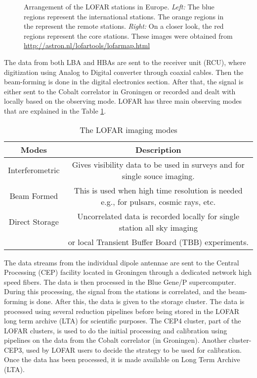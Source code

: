 \documentclass[../main/thesis_msc.tex]{subfiles}
\begin{document}
\begin{figure}
        \centering
        \caption{Arrangement of the LOFAR stations in Europe. \textit{Left:} The blue regions represent the international stations. The orange regions in the represent the remote stations. \textit{Right:} On a closer look, the red regions represent the core stations. These images were obtained from \url{http://astron.nl/lofartools/lofarmap.html}}
        \label{lofar_arrangement}
        \end{figure}
The data from both LBA and HBAs are sent to the receiver unit (RCU), where digitization using Analog to Digital converter through coaxial cables. Then the beam-forming is done in the digital electronics section. After that, the signal is either sent to the Cobalt correlator in Groningen or recorded and dealt with locally based on the observing mode. LOFAR has three main observing modes that are explained in the Table \ref{moooo}. 
\begin{table}
\centering
\begin{tabular}{cc}
\toprule
\textbf{Modes} & \textbf{Description}\\ 
\midrule
Interferometric & Gives visibility data to be used in surveys and for single souce imaging. \\
Beam Formed & This is used when high time resolution is needed e.g., for pulsars, cosmic rays, etc. \\
Direct Storage & Uncorrelated data is recorded locally for single station all sky imaging\\ & or local Transient Buffer Board (TBB) experiments.\\
\bottomrule
\end{tabular}
\caption{The LOFAR imaging modes}
\label{moooo}
\end{table}
The data streams from the individual dipole antennae are sent to the Central Processing (CEP) facility located in Groningen through a dedicated network high speed fibers. The data is then processed in the Blue Gene/P supercomputer. During this processing, the signal from the stations is correlated, and the beam-forming is done. After this, the data is given to the storage cluster. The data is processed using several reduction pipelines before being stored in the LOFAR long term archive (LTA) for scientific purposes. 
The CEP4 cluster, part of the LOFAR clusters, is used to do the initial processing and calibration using pipelines on the data from the Cobalt correlator (in Groningen). Another cluster- CEP3, used by LOFAR users to decide the strategy to be used for calibration. Once the data has been processed, it is made available on Long Term Archive (LTA).\\
\end{document}
